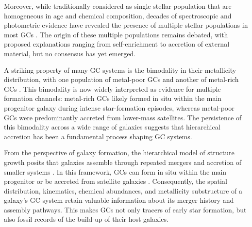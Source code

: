     Moreover, while traditionally considered as single stellar population that are homogeneous in age and chemical composition, decades of spectroscopic and photometric evidence have revealed the presence of multiple stellar populations in most GCs \citep{2008MNRAS.391..825D,2012A&ARv..20...50G,2018ARA&A..56...83B}. The origin of these multiple populations remains debated, with proposed explanations ranging from self-enrichment to accretion of external material, but no consensus has yet emerged.

    
    

    A striking property of many GC systems is the bimodality in their metallicity distribution, with one population of metal-poor GCs and another of metal-rich GCs \citep[e.g.,][]{2006ARA&A..44..193B, 2015ApJ...806...36H}. This bimodality is now widely interpreted as evidence for multiple formation channels: metal-rich GCs likely formed in situ within the main progenitor galaxy during intense star-formation episodes, whereas metal-poor GCs were predominantly accreted from lower-mass satellites. The persistence of this bimodality across a wide range of galaxies suggests that hierarchical accretion has been a fundamental process shaping GC systems.

    From the perspective of galaxy formation, the hierarchical model of structure growth posits that galaxies assemble through repeated mergers and accretion of smaller systems \citep{2015ARA&A..53...51S}. In this framework, GCs can form in situ within the main progenitor or be accreted from satellite galaxies \citep[e.g.,][]{2018MNRAS.479.4760F,2020MNRAS.498.2472K,2021ApJ...920...51M,2022ApJ...930L...9M,2023A&A...673A..86P,2024MNRAS.528.3198B,2025A&A...693A.155P}. Consequently, the spatial distribution, kinematics, chemical abundances, and metallicity substructure of a galaxy's GC system retain valuable information about its merger history and assembly pathways. This makes GCs not only tracers of early star formation, but also fossil records of the build-up of their host galaxies.

